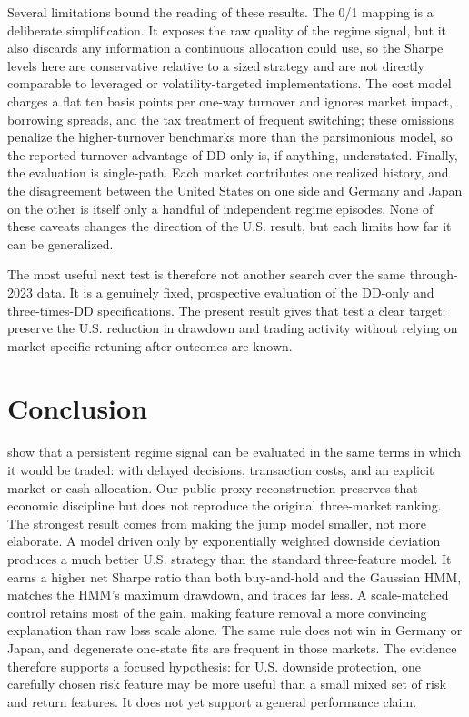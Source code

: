 \documentclass[11pt]{article}
\begin{document}
Several limitations bound the reading of these results. The 0/1 mapping is a
deliberate simplification. It exposes the raw quality of the regime signal, but
it also discards any information a continuous allocation could use, so the Sharpe
levels here are conservative relative to a sized strategy and are not directly
comparable to leveraged or volatility-targeted implementations. The cost model
charges a flat ten basis points per one-way turnover and ignores market impact,
borrowing spreads, and the tax treatment of frequent switching; these omissions
penalize the higher-turnover benchmarks more than the parsimonious model, so the
reported turnover advantage of DD-only is, if anything, understated. Finally, the
evaluation is single-path. Each market contributes one realized history, and the
disagreement between the United States on one side and Germany and Japan on the
other is itself only a handful of independent regime episodes. None of these
caveats changes the direction of the U.S. result, but each limits how far it can
be generalized.

The most useful next test is therefore not another search over the same
through-2023 data. It is a genuinely fixed, prospective evaluation of the DD-only
and three-times-DD specifications. The present result gives that test a clear
target: preserve the U.S. reduction in drawdown and trading activity without
relying on market-specific retuning after outcomes are known.

\section{Conclusion}

\citet{shu2024} show that a persistent regime signal can be evaluated in the same
terms in which it would be traded: with delayed decisions, transaction costs, and
an explicit market-or-cash allocation. Our public-proxy reconstruction preserves
that economic discipline but does not reproduce the original three-market
ranking. The strongest result comes from making the jump model smaller, not more
elaborate. A model driven only by exponentially weighted downside deviation
produces a much better U.S. strategy than the standard three-feature model. It
earns a higher net Sharpe ratio than both buy-and-hold and the Gaussian HMM,
matches the HMM's maximum drawdown, and trades far less. A scale-matched control
retains most of the gain, making feature removal a more convincing explanation
than raw loss scale alone. The same rule does not win in Germany or Japan, and
degenerate one-state fits are frequent in those markets. The evidence therefore
supports a focused hypothesis: for U.S. downside protection, one carefully chosen
risk feature may be more useful than a small mixed set of risk and return
features. It does not yet support a general performance claim.
\end{document}
